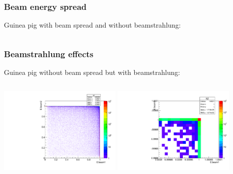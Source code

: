 \documentclass{beamer}
\begin{document}
\begin{frame}
\frametitle{Beam energy spread}\label{slide:beamspread}
Guinea pig \alert{with} beam spread and \alert{without} beamstrahlung:\\
\begin{columns}[c]
\column{6cm}
\column{6cm}
\end{columns}

\end{frame}

\begin{frame}
\frametitle{Beamstrahlung effects}\label{slide:beamstrahlung}
Guinea pig \alert{without} beam spread but \alert{with} beamstrahlung:\\
\begin{columns}[c]
\column{6cm}
\includegraphics[width=6cm]{E1_E2_nospread_with_strahlung.pdf}
 \column{6cm}
\includegraphics[width=6cm]{E1_E2_nospread_strahlung_zoom.pdf}
\end{columns}
\end{frame}
\end{document}
